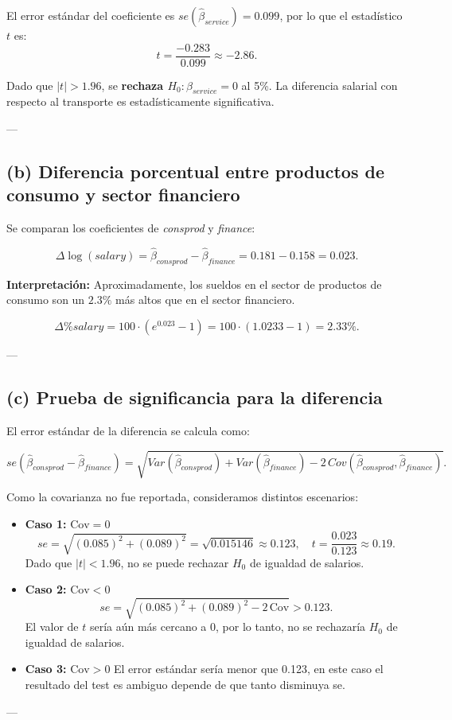 \documentclass{article}
\begin{document}
El error estándar del coeficiente es $se(\hat{\beta}_{service}) = 0.099$, por lo que el estadístico $t$ es:
\[
t = \frac{-0.283}{0.099} \approx -2.86.
\]

Dado que $|t| > 1.96$, se \textbf{rechaza $H_0: \beta_{service} = 0$} al 5\%.  
La diferencia salarial con respecto al transporte es estadísticamente significativa.

---

\subsection*{(b) Diferencia porcentual entre productos de consumo y sector financiero}

Se comparan los coeficientes de \textit{consprod} y \textit{finance}:

\[
\Delta \log(salary) = \hat{\beta}_{consprod} - \hat{\beta}_{finance}
= 0.181 - 0.158 = 0.023.
\]

\noindent
\textbf{Interpretación:}  
Aproximadamente, los sueldos en el sector de productos de consumo son un $2.3\%$ más altos que en el sector financiero.

\[
\Delta \% salary = 100 \cdot \left( e^{0.023} - 1 \right)
= 100 \cdot (1.0233 - 1) = 2.33\%.
\]

---

\subsection*{(c) Prueba de significancia para la diferencia}

El error estándar de la diferencia se calcula como:

\[
se(\hat{\beta}_{consprod} - \hat{\beta}_{finance})
= \sqrt{Var(\hat{\beta}_{consprod}) + Var(\hat{\beta}_{finance}) - 2 \, Cov(\hat{\beta}_{consprod}, \hat{\beta}_{finance})}.
\]

\noindent
Como la covarianza no fue reportada, consideramos distintos escenarios:

\begin{itemize}
\item \textbf{Caso 1:} $\text{Cov} = 0$
\[
se = \sqrt{(0.085)^2 + (0.089)^2}
= \sqrt{0.015146} \approx 0.123,
\quad
t = \frac{0.023}{0.123} \approx 0.19.
\]
Dado que $|t| < 1.96$, no se puede rechazar $H_0$ de igualdad de salarios.

\item \textbf{Caso 2:} $\text{Cov} < 0$  
\[
se = \sqrt{(0.085)^2 + (0.089)^2 - 2\,\text{Cov}} > 0.123.
\]
El valor de $t$ sería aún más cercano a 0, por lo tanto, no se rechazaría $H_0$ de igualdad de salarios.

\item \textbf{Caso 3:} $\text{Cov} > 0$  
El error estándar sería menor que 0.123, en este caso el resultado del test es ambiguo depende de que tanto disminuya se.  
\end{itemize}

---
\end{document}
